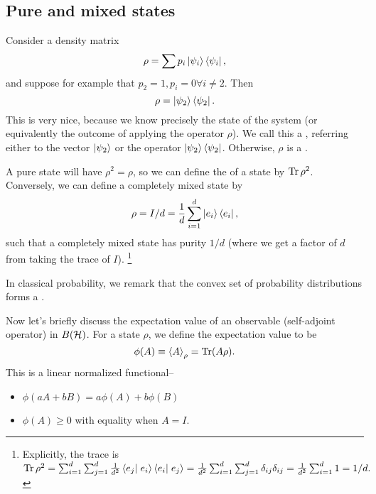 \subsection*{Pure and mixed states} 
Consider a density matrix
\begin{equation}
    \rho = \sum p_i \left| \psi_i \right>\left< \psi_i \right|,
\end{equation}
and suppose for example that $p_2=1, p_i=0 \forall i\neq 2$. Then
\begin{equation}
    \rho=\left| \psi_2 \right>\left< \psi_2 \right|.
\end{equation}
This is very nice, because we know precisely the state of the system (or equivalently the outcome of applying the operator $\rho$). We call this a , referring either to the vector $\left| \psi_2 \right>$ or the operator $\left| \psi_2 \right>\left< \psi_2 \right|$. Otherwise, $\rho$ is a .

A pure state will have $\rho^2 = \rho$, so we can define the  of a state by $\operatorname{Tr} \rho^2$. Conversely, we can define a completely mixed state by
\begin{equation}
    \rho = I/d=\frac{1}{d} \sum_{i=1}^d \left| e_i \right> \left< e_i \right|,
\end{equation}
such that a completely mixed state has purity $1/d$ (where we get a factor of $d$ from taking the trace of $I$).%
    \footnote{Explicitly, the trace is $\Tr \rho^2 = \sum_{i=1}^d \sum_{j=1}^d \frac{1}{d^2} \braket{e_j}{e_i}\braket{e_i}{e_j}=\frac{1}{d^2}\sum_{i=1}^d \sum_{j=1}^d \delta_{ij} \delta_{ij} = \frac{1}{d^2}\sum_{i=1}^d 1 = 1/d.$
    }

In classical probability, we remark that the convex set of probability distributions forms a .

Now let's briefly discuss the expectation value of an observable (self-adjoint operator) in $B(\mathcal H)$. For a state $\rho$, we define the expectation value to be
\begin{equation}
    \phi(A) \equiv \left< A \right>_\rho =\operatorname{Tr}(A \rho).
\end{equation}
This is a linear normalized functional--
\begin{itemize}
    \item $\phi(aA +b B) = a\phi(A) + b\phi(B)$
    \item $\phi(A)\geq 0$ with equality when $A=I$.
\end{itemize}